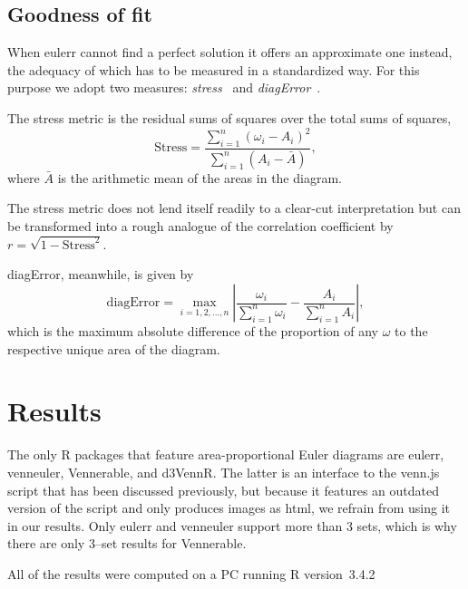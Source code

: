 \documentclass[
  a4paper,
  nofonts,
  nobib,
  nohyper,
  openany
]{tufte-book}\usepackage[]{graphicx}\usepackage[]{color}
\newcommand{\pkg}[1]{{\fontseries{b}\selectfont #1}}
\begin{document}
\section{Goodness of fit}
\label{sec:gof}

When \pkg{eulerr} cannot find a perfect solution it offers an approximate one instead, the adequacy of which has to be measured in a standardized way. For this purpose we adopt two measures: \emph{stress}~\citep{wilkinson_2012} and \emph{diagError}~\citep{micallef_2014}.

The stress metric is the residual sums of squares over the total sums of squares,
\begin{equation}
\text{Stress} = \frac{\sum_{i=1}^n (\omega_i - A_i)^2}{\sum_{i=1}^n (A_i - \bar{A})},
\label{eq:stress}
\end{equation}
where $\bar{A}$ is the arithmetic mean of the areas in the diagram.

The stress metric does not lend itself readily to a clear-cut interpretation but can be transformed into a rough analogue of the correlation coefficient by $r = \sqrt{1-\text{Stress}^2}$.

diagError, meanwhile, is given by
\begin{equation}
\text{diagError} = \max_{i = 1, 2, \dots, n} \left| \frac{\omega_i}{\sum_{i=1}^n \omega_i} -
  \frac{A_i}{\sum_{i=1}^n A_i} \right|,
\label{eq:diagError}
\end{equation}
which is the maximum absolute difference of the proportion of any $\omega$ to the respective unique area of the diagram.

\chapter{Results}
\label{ch:results}

The only R packages that feature area-proportional Euler diagrams are \pkg{eulerr}, \pkg{venneuler}, \pkg{Vennerable}, and \pkg{d3VennR}. The latter is an interface to the \pkg{venn.js} script that has been discussed previously, but because it features an outdated version of the script and only produces images as html, we refrain from using it in our results. Only \pkg{eulerr} and \pkg{venneuler} support more than 3 sets, which is why there are only 3--set results for \pkg{Vennerable}.

All of the results were computed on a PC running R version~3.4.2%
\end{document}
